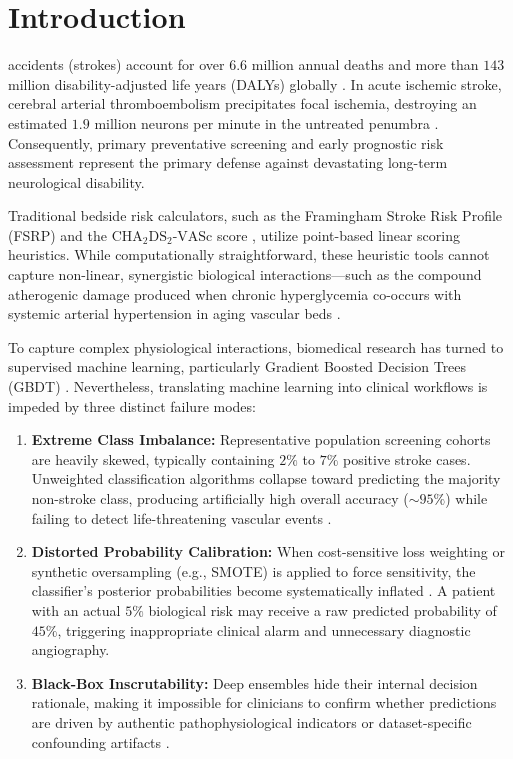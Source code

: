 \documentclass[conference]{IEEEtran}
\begin{document}
\section{Introduction}
 accidents (strokes) account for over $6.6$ million annual deaths and more than $143$ million disability-adjusted life years (DALYs) globally \cite{feigin2021global}. In acute ischemic stroke, cerebral arterial thromboembolism precipitates focal ischemia, destroying an estimated $1.9$ million neurons per minute in the untreated penumbra \cite{saver2006time}. Consequently, primary preventative screening and early prognostic risk assessment represent the primary defense against devastating long-term neurological disability.

Traditional bedside risk calculators, such as the Framingham Stroke Risk Profile (FSRP) \cite{wolf1991probability} and the $\text{CHA}_2\text{DS}_2\text{-VASc}$ score \cite{lip2010refining}, utilize point-based linear scoring heuristics. While computationally straightforward, these heuristic tools cannot capture non-linear, synergistic biological interactions---such as the compound atherogenic damage produced when chronic hyperglycemia co-occurs with systemic arterial hypertension in aging vascular beds \cite{spence2010intensive}.

To capture complex physiological interactions, biomedical research has turned to supervised machine learning, particularly Gradient Boosted Decision Trees (GBDT) \cite{friedman2001greedy}. Nevertheless, translating machine learning into clinical workflows is impeded by three distinct failure modes:
\begin{enumerate}
    \item \textbf{Extreme Class Imbalance:} Representative population screening cohorts are heavily skewed, typically containing $2\%$ to $7\%$ positive stroke cases. Unweighted classification algorithms collapse toward predicting the majority non-stroke class, producing artificially high overall accuracy ($\sim 95\%$) while failing to detect life-threatening vascular events \cite{he2009learning}.
    \item \textbf{Distorted Probability Calibration:} When cost-sensitive loss weighting or synthetic oversampling (e.g., SMOTE) is applied to force sensitivity, the classifier's posterior probabilities become systematically inflated \cite{niculescu2005predicting}. A patient with an actual $5\%$ biological risk may receive a raw predicted probability of $45\%$, triggering inappropriate clinical alarm and unnecessary diagnostic angiography.
    \item \textbf{Black-Box Inscrutability:} Deep ensembles hide their internal decision rationale, making it impossible for clinicians to confirm whether predictions are driven by authentic pathophysiological indicators or dataset-specific confounding artifacts \cite{rudin2019stop}.
\end{enumerate}
\end{document}
